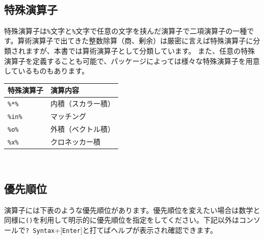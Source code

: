 \documentclass[
  12pt,
]{book}
\begin{document}
　

\hypertarget{ux7279ux6b8aux6f14ux7b97ux5b50}{%
\subsection{特殊演算子}\label{ux7279ux6b8aux6f14ux7b97ux5b50}}

特殊演算子は\texttt{\%}文字と\texttt{\%}文字で任意の文字を挟んだ演算子で二項演算子の一種です。算術演算子で出てきた整数除算（商、剰余）は厳密に言えば特殊演算子に分類されますが、本書では算術演算子として分類しています。 また、任意の特殊演算子を定義することも可能で、パッケージによっては様々な特殊演算子を用意しているものもあります。

\begin{longtable}[]{@{}ll@{}}
\toprule
特殊演算子 & 演算内容 \\
\midrule
\endhead
\texttt{\%*\%} & 内積（スカラー積） \\
\texttt{\%in\%} & マッチング \\
\texttt{\%o\%} & 外積（ベクトル積） \\
\texttt{\%x\%} & クロネッカー積 \\
\bottomrule
\end{longtable}

　

\hypertarget{ux512aux5148ux9806ux4f4d}{%
\subsection{優先順位}\label{ux512aux5148ux9806ux4f4d}}

演算子には下表のような優先順位があります。優先順位を変えたい場合は数学と同様に\texttt{()}を利用して明示的に優先順位を指定をしてください。下記以外はコンソールで\texttt{?\ Syntax}+{[}\texttt{Enter}{]}と打てばヘルプが表示され確認できます。
\end{document}
